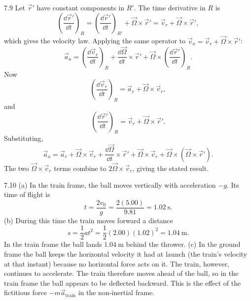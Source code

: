 \begin{solution}{7.9}
Let $\vec r'$ have constant components in $R'$. The time derivative in $R$ is
\[
\left(\frac{\dd\vec r'}{\dd t}\right)_R
=\left(\frac{\dd\vec r'}{\dd t}\right)_{R'}
+\vec\Omega\times\vec r'
=\vec v_r+\vec\Omega\times\vec r',
\]
which gives the velocity law. Applying the same operator to
$\vec v_a=\vec v_r+\vec\Omega\times\vec r'$:
\[
\vec a_a=\left(\frac{\dd\vec v_r}{\dd t}\right)_R
+\frac{\dd\vec\Omega}{\dd t}\times\vec r'
+\vec\Omega\times\left(\frac{\dd\vec r'}{\dd t}\right)_R.
\]
Now
\[
\left(\frac{\dd\vec v_r}{\dd t}\right)_R=\vec a_r+\vec\Omega\times\vec v_r,
\]
and
\[
\left(\frac{\dd\vec r'}{\dd t}\right)_R=\vec v_r+\vec\Omega\times\vec r'.
\]
Substituting,
\[
\vec a_a=\vec a_r+\vec\Omega\times\vec v_r
+\frac{\dd\vec\Omega}{\dd t}\times\vec r'
+\vec\Omega\times\vec v_r
+\vec\Omega\times(\vec\Omega\times\vec r').
\]
The two $\vec\Omega\times\vec v_r$ terms combine to $2\vec\Omega\times\vec v_r$,
giving the stated result.
\end{solution}


\begin{tabletworkspace}[6.5cm]
\end{tabletworkspace}

\begin{solution}{7.10}
(a) In the train frame, the ball moves vertically with acceleration $-g$. Its
time of flight is
\[
t=\frac{2v_0}{g}=\frac{2(5.00)}{9.81}=1.02\ \mathrm{s}.
\]
(b) During this time the train moves forward a distance
\[
s=\frac12at^2=\frac12(2.00)(1.02)^2=1.04\ \mathrm{m}.
\]
In the train frame the ball lands $1.04\ $ behind the thrower.
(c) In the ground frame the ball keeps the horizontal velocity it had at launch
(the train's velocity at that instant) because no horizontal force acts on it.
The train, however, continues to accelerate. The train therefore moves ahead of
the ball, so in the train frame the ball appears to be deflected backward. This
is the effect of the fictitious force $-m\vec a_{}$ in the
non-inertial frame.
\end{solution}

